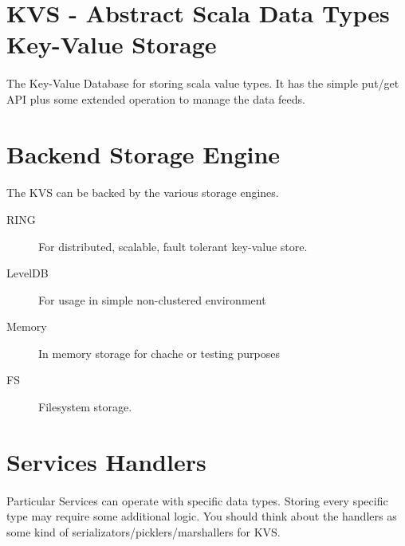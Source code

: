 \section*{KVS - Abstract Scala Data Types Key-Value Storage}
\paragraph{}
The Key-Value Database for storing scala value types. It has the simple put/get API plus some extended operation to manage the data feeds.

\section*{Backend Storage Engine}
\paragraph{}
The KVS can be backed by the various storage engines.
\begin{description}
\item[RING] For distributed, scalable, fault tolerant key-value store.
\item[LevelDB] For usage in simple non-clustered environment
\item[Memory] In memory storage for chache or testing purposes
\item[FS] Filesystem storage.
\end{description}

\section{Services Handlers}
\paragraph{}
Particular Services can operate with specific data types. Storing every specific type may require some additional logic.
You should think about the handlers as some kind of serializators/picklers/marshallers for KVS.
